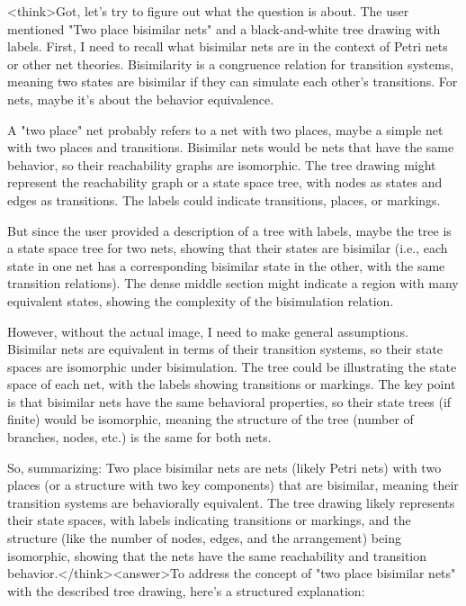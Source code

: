 <think>Got, let's try to figure out what the question is about. The user mentioned "Two place bisimilar nets" and a black-and-white tree drawing with labels. First, I need to recall what bisimilar nets are in the context of Petri nets or other net theories. Bisimilarity is a congruence relation for transition systems, meaning two states are bisimilar if they can simulate each other's transitions. For nets, maybe it's about the behavior equivalence.

A "two place" net probably refers to a net with two places, maybe a simple net with two places and transitions. Bisimilar nets would be nets that have the same behavior, so their reachability graphs are isomorphic. The tree drawing might represent the reachability graph or a state space tree, with nodes as states and edges as transitions. The labels could indicate transitions, places, or markings.

But since the user provided a description of a tree with labels, maybe the tree is a state space tree for two nets, showing that their states are bisimilar (i.e., each state in one net has a corresponding bisimilar state in the other, with the same transition relations). The dense middle section might indicate a region with many equivalent states, showing the complexity of the bisimulation relation.

However, without the actual image, I need to make general assumptions. Bisimilar nets are equivalent in terms of their transition systems, so their state spaces are isomorphic under bisimulation. The tree could be illustrating the state space of each net, with the labels showing transitions or markings. The key point is that bisimilar nets have the same behavioral properties, so their state trees (if finite) would be isomorphic, meaning the structure of the tree (number of branches, nodes, etc.) is the same for both nets.

So, summarizing: Two place bisimilar nets are nets (likely Petri nets) with two places (or a structure with two key components) that are bisimilar, meaning their transition systems are behaviorally equivalent. The tree drawing likely represents their state spaces, with labels indicating transitions or markings, and the structure (like the number of nodes, edges, and the arrangement) being isomorphic, showing that the nets have the same reachability and transition behavior.</think><answer>To address the concept of "two place bisimilar nets" with the described tree drawing, here's a structured explanation:  

